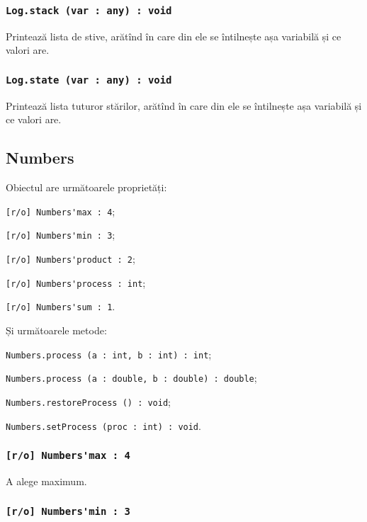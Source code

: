 \subsubsection{\lstinline|Log.stack (var : any) : void|}

Printează lista de stive, arătînd în care din ele se întilnește așa variabilă și ce valori are.

\subsubsection{\lstinline|Log.state (var : any) : void|}

Printează lista tuturor stărilor, arătînd în care din ele se întilnește așa variabilă și ce valori are.

\subsection{{\color{orange} Numbers}}

Obiectul \numbers{} are următoarele proprietăți:
\begin{icItems}
	\item \lstinline|[r/o] Numbers'max : 4|;
	\item \lstinline|[r/o] Numbers'min : 3|;
	\item \lstinline|[r/o] Numbers'product : 2|;
	\item \lstinline|[r/o] Numbers'process : int|;
	\item \lstinline|[r/o] Numbers'sum : 1|.
\end{icItems}

Și următoarele metode:
\begin{icItems}
	\item \lstinline|Numbers.process (a : int, b : int) : int|;
	\item \lstinline|Numbers.process (a : double, b : double) : double|;
	\item \lstinline|Numbers.restoreProcess () : void|;
	\item \lstinline|Numbers.setProcess (proc : int) : void|.
\end{icItems}

\subsubsection{\lstinline|[r/o] Numbers'max : 4|}

A alege maximum.

\subsubsection{\lstinline|[r/o] Numbers'min : 3|}

